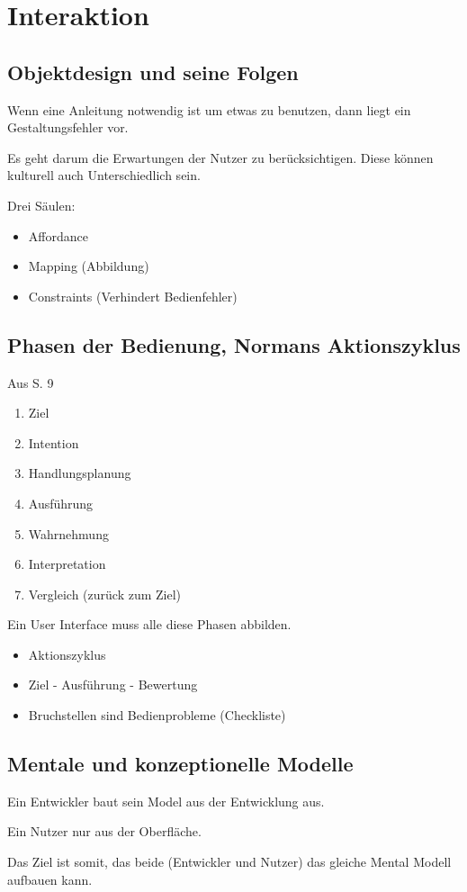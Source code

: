 \documentclass[a4paper]{article}
\title{\docTitle}
\author{Moritz}
\date{\today}
\begin{document}
\maketitle
\tableofcontents


\section{Interaktion}

\subsection{Objektdesign und seine Folgen}

Wenn eine Anleitung notwendig ist um etwas zu benutzen, dann liegt ein Gestaltungsfehler vor.

Es geht darum die Erwartungen der Nutzer zu berücksichtigen. Diese können kulturell auch Unterschiedlich sein.

Drei Säulen:

\begin{itemize}
    \item Affordance
    \item Mapping (Abbildung)
    \item Constraints (Verhindert Bedienfehler)
\end{itemize}

\subsection{Phasen der Bedienung, Normans Aktionszyklus}

Aus S. 9

\begin{enumerate}
    \item Ziel
    \item Intention
    \item Handlungsplanung
    \item Ausführung
    \item Wahrnehmung
    \item Interpretation
    \item Vergleich (zurück zum Ziel)
\end{enumerate}

Ein User Interface muss alle diese Phasen abbilden.

\begin{itemize}
    \item Aktionszyklus
    \item Ziel - Ausführung - Bewertung
    \item Bruchstellen sind Bedienprobleme (Checkliste)
\end{itemize}

\subsection{Mentale und konzeptionelle Modelle}

Ein Entwickler baut sein Model aus der Entwicklung aus.

Ein Nutzer nur aus der Oberfläche. 

Das Ziel ist somit, das beide (Entwickler und Nutzer) das gleiche Mental Modell aufbauen kann.
\end{document}
